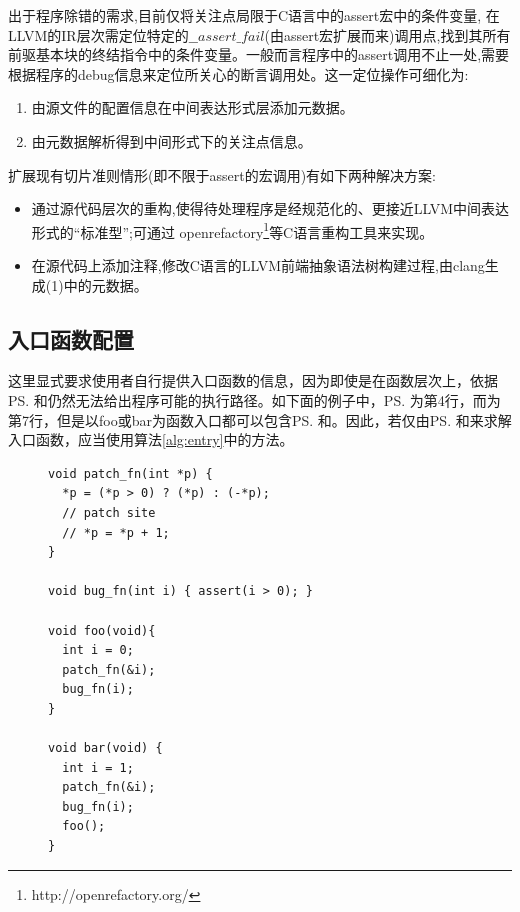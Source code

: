 出于程序除错的需求,目前仅将关注点局限于C语言中的assert宏中的条件变量, 在 LLVM的IR层次需定位特定的$\_\_assert\_fail$(由assert宏扩展而来)调用点,找到其所有前驱基本块的终结指令中的条件变量。一般而言程序中的assert调用不止一处,需要根据程序的debug信息来定位所关心的断言调用处。这一定位操作可细化为: 
\begin{enumerate}[label={(\arabic*)}]
\item 由源文件的配置信息在中间表达形式层添加元数据。
\item 由元数据解析得到中间形式下的关注点信息。
\end{enumerate}

扩展现有切片准则情形(即不限于assert的宏调用)有如下两种解决方案:
\begin{itemize}
\item 通过源代码层次的重构,使得待处理程序是经规范化的、更接近LLVM中间表达形式的“标准型”;可通过 openrefactory\footnote{http://openrefactory.org/}等C语言重构工具来实现。
\item 在源代码上添加注释,修改C语言的LLVM前端抽象语法树构建过程,由clang生成(1)中的元数据。
\end{itemize}

\subsection{入口函数配置}
\label{sec:entry_config}
这里显式要求使用者自行提供入口函数的信息，因为即使是在函数层次上，依据\prog\ps 和\prog\bs 仍然无法给出程序可能的执行路径。如下面的例子中，\prog\ps 为第4行，而\prog\bs 为第7行，但是以foo或bar为函数入口都可以包含\prog\ps 和\prog\bs 。因此，若仅由\prog\ps 和\prog\bs 来求解入口函数，应当使用算法\autoref{alg:entry}中的方法。

\begin{figure}[t]
\begin{center}
\begin{lstlisting}[language={[ANSI]C}]
void patch_fn(int *p) { 
  *p = (*p > 0) ? (*p) : (-*p); 
  // patch site
  // *p = *p + 1;
}

void bug_fn(int i) { assert(i > 0); }

void foo(void){
  int i = 0;
  patch_fn(&i);
  bug_fn(i);
}

void bar(void) {
  int i = 1;
  patch_fn(&i);
  bug_fn(i);
  foo();
}
\end{lstlisting}
\end{center}
\end{figure}

